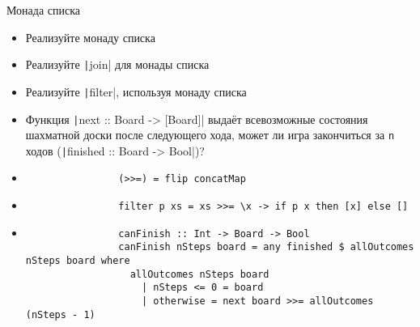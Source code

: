     \begin{frame}[fragile]{Монада списка}
        \begin{itemize}
            \item[\todo] Реализуйте монаду списка
            \item[\todo] Реализуйте \texttt|join| для монады списка
            \item[\todo] Реализуйте \texttt|filter|, используя монаду списка
            \item[\todo] Функция \texttt|next :: Board -> [Board]| выдаёт всевозможные состояния шахматной доски после следующего хода, может ли игра закончиться за \texttt{n} ходов (\texttt|finished :: Board -> Bool|)?
            \item[\answer] \pause
            \begin{verbatim}
                (>>=) = flip concatMap
            \end{verbatim}
            \item[\answer] \pause
            \begin{verbatim}
                filter p xs = xs >>= \x -> if p x then [x] else []
            \end{verbatim}
            \item[\answer] \pause
            \begin{verbatim}
                canFinish :: Int -> Board -> Bool
                canFinish nSteps board = any finished $ allOutcomes nSteps board where
                  allOutcomes nSteps board
                    | nSteps <= 0 = board
                    | otherwise = next board >>= allOutcomes (nSteps - 1)
            \end{verbatim}
        \end{itemize}
    \end{frame}
    
